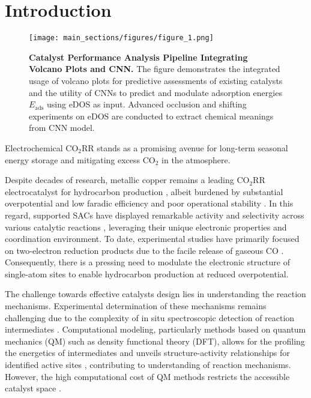 

\section{Introduction}

\begin{figure}
    \centering
    \texttt{[image: main\_sections/figures/figure\_1.png]}
    \caption{\textbf{Catalyst Performance Analysis Pipeline Integrating Volcano Plots and CNN.}
    The figure demonstrates the integrated usage of volcano plots for predictive assessments of existing catalysts and the utility of CNNs to predict and modulate adsorption energies \(E_{\text{ads}}\) using eDOS as input.
    Advanced occlusion and shifting experiments on eDOS are conducted to extract chemical meanings from CNN model.}
    \label{main_fig1:pipeline}
\end{figure}

Electrochemical CO$_2$RR stands as a promising avenue for long-term seasonal energy storage \cite{dinh2018co2} and mitigating excess CO$_2$ in the atmosphere.

Despite decades of research, metallic copper remains a leading CO$_2$RR electrocatalyst for hydrocarbon production \cite{osella2023co2}, albeit burdened by substantial overpotential and low faradic efficiency and poor operational stability \cite{chen2019identifying, liu2021co2}.
In this regard, supported SACs have displayed remarkable activity and selectivity across various catalytic reactions \cite{wang2018heterogeneous, yang2018atomically}, leveraging their unique electronic properties and coordination environment.
To date, experimental studies have primarily focused on two-electron reduction products due to the facile release of gaseous CO \cite{cai2021insights, ju2017understanding, ren2019isolated}.
Consequently, there is a pressing need to modulate the electronic structure of single-atom sites to enable hydrocarbon production at reduced overpotential.

The challenge towards effective catalysts design lies in understanding the reaction mechanisms.
Experimental determination of these mechanisms remains challenging due to the complexity of in situ spectroscopic detection of reaction intermediates \cite{zhao2021revisiting}.
Computational modeling, particularly methods based on quantum mechanics (QM) such as density functional theory (DFT),
allows for the profiling the energetics of intermediates and unveils structure-activity relationships for identified active sites \cite{feaster2017understanding, carter2008challenges}, contributing to understanding of reaction mechanisms.
However, the high computational cost of QM methods restricts the accessible catalyst space \cite{jinnouchi2017predicting, cuenya2015nanocatalysis, goldsmith2018machine}.

